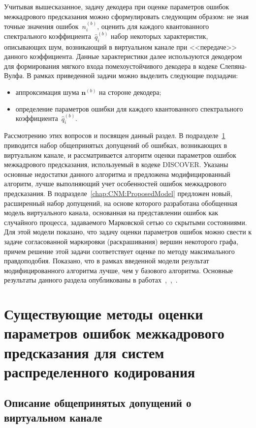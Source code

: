 Учитывая вышесказанное, задачу декодера при оценке параметров ошибок межкадрового предсказания можно сформулировать следующим образом: не зная точные значения ошибок~$n^{(b)}_i$, оценить для каждого квантованного спектрального коэффициента~$\hat{q}^{(b)}_i$ набор некоторых характеристик, описывающих шум, возникающий в виртуальном канале при <<передаче>> данного коэффициента. Данные характеристики далее используются декодером для формирования мягкого входа помехоустойчивого декодера в кодеке Слепяна-Вулфа. В рамках приведенной задачи можно выделить следующие подзадачи:
\begin{itemize}
\item аппроксимация шума $\mathbf{n}^{(b)}$ на стороне декодера;
\item определение параметров ошибки для каждого квантованного спектрального коэффициента~$\hat{q}^{(b)}_i$.
\end{itemize}

Рассмотрению этих вопросов и посвящен данный раздел. В подразделе~\ref{chap:CNM:ReferenceAlgo} приводится набор общепринятых допущений об ошибках, возникающих в виртуальном канале, и рассматривается алгоритм оценки параметров ошибок межкадрового предсказания, используемый в кодеке DISCOVER. Указаны основные недостатки данного алгоритма и предложена модифицированный алгоритм, лучше выполняющий учет особенностей ошибок межкадрового предсказания. В подразделе~\ref{chap:CNM:ProposedModel} предложен новый, расширенный набор допущений, на основе которого разработана обобщенная модель виртуального канала, основанная на представлении ошибок как случайного процесса, задаваемого Марковской сетью со скрытыми состояниями. Для этой модели показано, что задачу оценки параметров ошибок можно свести к задаче согласованной маркировки (раскрашивания) вершин некоторого графа, причем решение этой задачи соответствует оценке по методу максимального правдоподобия. Показано, что в рамках введенной модели результат модифицированного алгоритма лучше, чем у базового алгоритма. Основные результаты данного раздела опубликованы в работах~\cite{Icumt2014},~\cite{KES2015},~\cite{Suai2011}.

\section{Существующие методы оценки параметров ошибок межкадрового предсказания для систем распределенного кодирования}
\label{chap:CNM:ReferenceAlgo}

\subsection{Описание общепринятых допущений о виртуальном канале}
\label{chap:CNM:ReferenceAlgo:CommonAssumptions}

